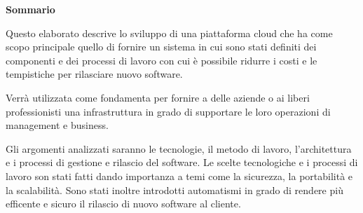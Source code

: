 \begin{center}
    \textbf{Sommario}
\end{center}
{\itshape{
    Questo elaborato descrive lo sviluppo di una piattaforma cloud che ha come scopo principale quello di fornire un sistema in cui sono stati definiti
    dei componenti e dei processi di lavoro con cui è possibile ridurre i costi e le tempistiche per rilasciare nuovo software.

    Verrà utilizzata come fondamenta per fornire a delle aziende o ai liberi
    professionisti una infrastruttura in grado di supportare le loro operazioni di management e business.

    Gli argomenti analizzati saranno le tecnologie, il metodo di lavoro, l'architettura e i processi di gestione e rilascio del software.
    Le scelte tecnologiche e i processi di lavoro son stati fatti dando importanza a temi come la sicurezza, la portabilità e la scalabilità.
    Sono stati inoltre introdotti automatismi in grado di rendere più efficente e sicuro il rilascio di nuovo software al cliente.
}}